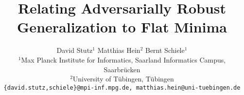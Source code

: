 \documentclass[10pt,twocolumn,letterpaper]{article}
\begin{document}
\title{Relating Adversarially Robust Generalization to Flat Minima}
\author{David Stutz$^{1}$ \qquad Matthias Hein$^{2}$ \qquad Bernt Schiele$^{1}$\\
$^1$Max Planck Institute for Informatics, Saarland Informatics Campus, Saarbr\"{u}cken\\
$^2$University of T\"{u}bingen, T\"{u}bingen\\
{\tt\small \{david.stutz,schiele\}@mpi-inf.mpg.de, matthias.hein@uni-tuebingen.de}	
}

\maketitle

\ificcvfinal\thispagestyle{empty}\fi







{\small


}

\clearpage
\begin{appendix}



\end{appendix}
\end{document}
